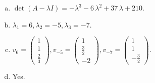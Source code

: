 \begin{questions}
\begin{solution}
\begin{enumerate}[(a)]
\item $\det(A-\lambda I)=-{\lambda}^{3} - 6 \, {\lambda}^{2} + 37 \, {\lambda} + 210$.
\item ${\lambda}_1=6, {\lambda}_2=-5, {\lambda}_3=-7$.
\item $v_{6}=\left(\begin{array}{r}
1 \\
1 \\
\frac{2}{3}
\end{array}\right), v_{-5}=\left(\begin{array}{r}
1 \\
\frac{3}{2} \\
-2
\end{array}\right), v_{-7}=\left(\begin{array}{r}
1 \\
1 \\
-\frac{3}{2}
\end{array}\right)$.
\item Yes.
\end{enumerate}
\end{solution}

\end{questions}

\newpage


\begin{center}
\end{center}

